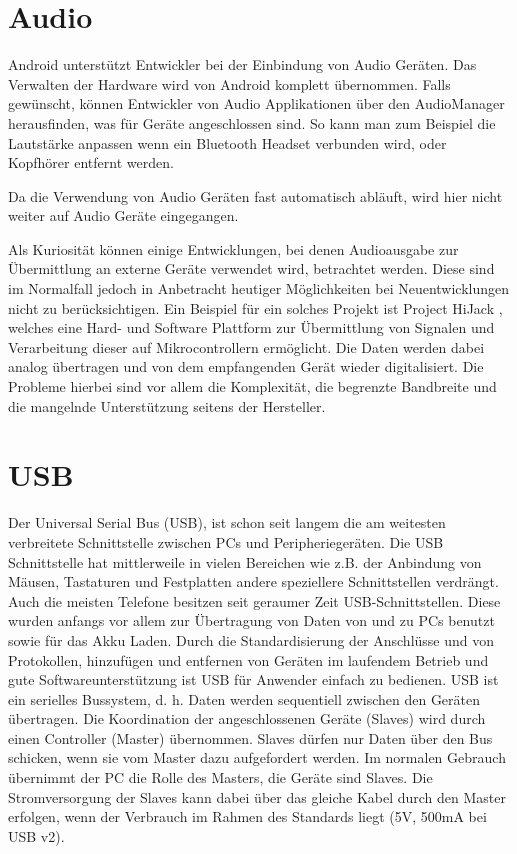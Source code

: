 \documentclass[12pt,journal,compsoc]{IEEEtran}
\begin{document}
\section{Audio}
Android unterstützt Entwickler bei der Einbindung von Audio Geräten. Das Verwalten der Hardware wird von Android komplett übernommen.
Falls gewünscht, können Entwickler von Audio Applikationen über den AudioManager herausfinden, was für Geräte angeschlossen sind. So kann man zum Beispiel die Lautstärke anpassen wenn ein Bluetooth Headset verbunden wird, oder Kopfhörer entfernt werden.

Da die Verwendung von Audio Geräten fast automatisch abläuft, wird hier nicht weiter auf Audio Geräte eingegangen.

Als Kuriosität können einige Entwicklungen, bei denen Audioausgabe zur Übermittlung an externe Geräte verwendet wird, betrachtet werden.
Diese sind im Normalfall jedoch in Anbetracht heutiger Möglichkeiten bei Neuentwicklungen nicht zu berücksichtigen.  
Ein Beispiel für ein solches Projekt ist Project HiJack \cite{hijack} , welches eine Hard- und Software Plattform zur Übermittlung von Signalen und Verarbeitung dieser auf Mikrocontrollern ermöglicht. 
Die Daten werden dabei analog übertragen und von dem empfangenden Gerät wieder digitalisiert.
Die Probleme hierbei sind vor allem die Komplexität, die begrenzte Bandbreite und die mangelnde Unterstützung seitens der Hersteller.

\section{USB}
Der Universal Serial Bus (USB), ist schon seit langem die am weitesten verbreitete Schnittstelle zwischen PCs und Peripheriegeräten.
Die USB Schnittstelle hat mittlerweile in vielen Bereichen wie z.B. der Anbindung von Mäusen, Tastaturen und Festplatten andere speziellere Schnittstellen verdrängt.
Auch die meisten Telefone besitzen seit geraumer Zeit USB-Schnittstellen. Diese wurden anfangs vor allem zur Übertragung von Daten von und zu PCs benutzt sowie für das Akku Laden.
Durch die Standardisierung der Anschlüsse und von Protokollen, hinzufügen und entfernen von Geräten im laufendem Betrieb und gute Softwareunterstützung ist USB für Anwender einfach zu bedienen.
USB ist ein serielles Bussystem, d. h. Daten werden sequentiell zwischen den Geräten übertragen. 
Die Koordination der angeschlossenen Geräte (Slaves) wird durch einen Controller (Master) übernommen.
Slaves dürfen nur Daten über den Bus schicken, wenn sie vom Master dazu aufgefordert werden.
Im normalen Gebrauch übernimmt der PC die Rolle des Masters, die Geräte sind Slaves. Die Stromversorgung der Slaves kann dabei über das gleiche Kabel durch den Master erfolgen, wenn der Verbrauch im Rahmen des Standards liegt (5V, 500mA bei USB v2).
\end{document}
